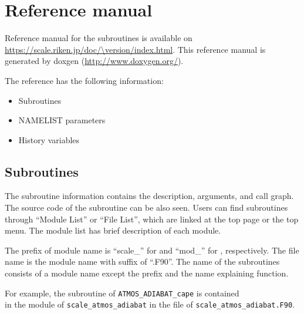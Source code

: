 \section{Reference manual} \label{sec:reference_manual}
Reference manual for the \scalelib subroutines is available on\\
\url{https://scale.riken.jp/doc/\version/index.html}.
This reference manual is generated by doxgen (\url{http://www.doxygen.org/}).

The reference has the following information:
\begin{itemize}
\item Subroutines
\item NAMELIST parameters
\item History variables
\end{itemize}


\subsection{Subroutines}
The subroutine information contains the description, arguments, and call graph.
The source code of the subroutine can be also seen.
Users can find subroutines through ``Module List'' or ``File List'', which are linked at the top page or the top menu.
The module list has brief description of each module.

The prefix of module name is ``scale\_'' for \scalelib and ``mod\_'' for \scalerm, respectively.
The file name is the module name with suffix of ``.F90''.
The name of the subroutines consists of a module name except the prefix and the name explaining function.

For example, the subroutine of \verb|ATMOS_ADIABAT_cape| is contained \\
in the module of \verb|scale_atmos_adiabat| in the file of \verb|scale_atmos_adiabat.F90|.





